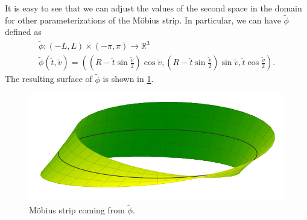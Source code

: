\documentclass[notoc,notitlepage]{tufte-book}
\begin{document}
\begin{eg}
  It is easy to see that we can adjust the values of the second space in the
  domain for other parameterizations of the M\"{o}bius strip. In particular, we
  can have $\tilde{\phi}$ defined as
  \begin{gather*}
    \tilde{\phi} : (-L, L) \times (-\pi, \pi) \to \mathbb{R}^3 \\
    \tilde{\phi}(\tilde{t}, \tilde{v}) = \left(
      \left( R - \tilde{t} \sin \frac{\tilde{v}}{2} \right) \cos \tilde{v},
      \left( R - \tilde{t} \sin \frac{\tilde{v}}{2} \right) \sin \tilde{v},
      \tilde{t} \cos \frac{\tilde{v}}{2} \right).
  \end{gather*}
  The resulting surface of $\tilde{\phi}$ is shown in
  \cref{fig:mobius_strip_coming_from_tildephi_}.
  \begin{figure}[ht]
    \centering
    \includegraphics[width=\linewidth]{images/mobius_angle2.png}
    
    \caption{M\"{o}bius strip coming from $\tilde{\phi}$.}
    \label{fig:mobius_strip_coming_from_tildephi_}
  \end{figure}


\end{eg}
\end{document}
